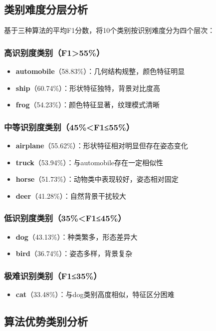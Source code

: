 \documentclass[UTF8]{report}
\theoremstyle{MyLineTheoremStyle} %
\theoremstyle{MyBlockTheoremStyle} %
\theoremstyle{MySubsubsectionStyle} %
\begin{document}
\subsection{类别难度分层分析}
基于三种算法的平均F1分数，将10个类别按识别难度分为四个层次：
\subsubsection{高识别度类别（F1>55\%）}
\begin{itemize}
    \item \textbf{automobile}（58.83\%）：几何结构规整，颜色特征明显
    \item \textbf{ship}（60.74\%）：形状特征独特，背景对比度高
    \item \textbf{frog}（54.23\%）：颜色特征显著，纹理模式清晰
\end{itemize}
\subsubsection{中等识别度类别（45\%<F1≤55\%）}
\begin{itemize}
    \item \textbf{airplane}（55.62\%）：形状特征相对明显但存在姿态变化
    \item \textbf{truck}（53.94\%）：与automobile存在一定相似性
    \item \textbf{horse}（51.73\%）：动物类中表现较好，姿态相对固定
    \item \textbf{deer}（41.28\%）：自然背景干扰较大
\end{itemize}
\subsubsection{低识别度类别（35\%<F1≤45\%）}
\begin{itemize}
    \item \textbf{dog}（43.13\%）：种类繁多，形态差异大
    \item \textbf{bird}（36.74\%）：姿态多样，背景复杂
\end{itemize}
\subsubsection{极难识别类别（F1≤35\%）}
\begin{itemize}
    \item \textbf{cat}（33.48\%）：与dog类别高度相似，特征区分困难
\end{itemize}

\subsection{算法优势类别分析}
\end{document}

